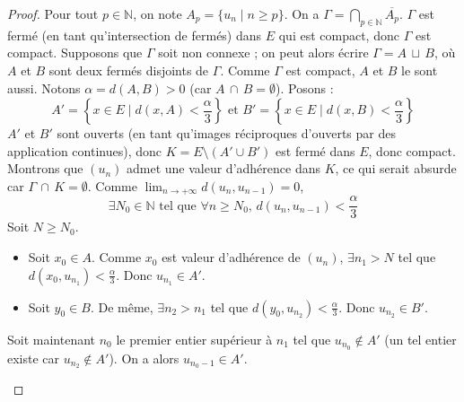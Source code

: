   \begin{proof}
    Pour tout $p \in \mathbb{N}$, on note $A_p = \{u_n \mid n\geq p\}$. On a $\Gamma = \bigcap_{p \in \mathbb{N}} \overline{A_p}$. $\Gamma$ est fermé (en tant qu'intersection de fermés) dans $E$ qui est compact, donc $\Gamma$ est compact.
    Supposons que $\Gamma$ soit non connexe ; on peut alors écrire $\Gamma = A \, \sqcup \, B$, où $A$ et $B$ sont deux fermés disjoints de $\Gamma$. Comme $\Gamma$ est compact, $A$ et $B$ le sont aussi. Notons $\alpha = d(A, B) > 0$ (car $A \, \cap \, B = \emptyset$). Posons :
    \[
    A'= \left \{ x \in E \mid d(x, A) < \frac{\alpha}{3} \right \} \text{ et } B'= \left \{ x \in E \mid d(x, B) < \frac{\alpha}{3} \right \}
    \]
    $A'$ et $B'$ sont ouverts (en tant qu'images réciproques d'ouverts par des application continues), donc $K = E \setminus (A'\cup B')$ est fermé dans $E$, donc compact.
    \newpar
    Montrons que $(u_n)$ admet une valeur d'adhérence dans $K$, ce qui serait absurde car $\Gamma \, \cap \, K = \emptyset$. Comme $\lim_{n \rightarrow +\infty} d(u_n, u_{n-1})=0$,
    \[ \exists N_0 \in \mathbb{N} \text{ tel que } \forall n \geq N_0, \, d(u_n, u_{n-1}) < \frac{\alpha}{3} \tag{$*$} \]
    Soit $N \geq N_0$.
    \begin{itemize}
      \item Soit $x_0 \in A$. Comme $x_0$ est valeur d'adhérence de $(u_n)$, $\exists n_1 > N$ tel que $d(x_0, u_{n_1}) < \frac{\alpha}{3}$. Donc $u_{n_1} \in A'$.
      \item Soit $y_0 \in B$. De même, $\exists n_2 > n_1$ tel que $d(y_0, u_{n_2}) < \frac{\alpha}{3}$. Donc $u_{n_2} \in B'$.
    \end{itemize}
    Soit maintenant $n_0$ le premier entier supérieur à $n_1$ tel que $u_{n_0} \notin A'$ (un tel entier existe car $u_{n_2} \notin A'$). On a alors $u_{n_0 - 1} \in A'$.
    \begin{center}
\end{center}
\end{proof}
